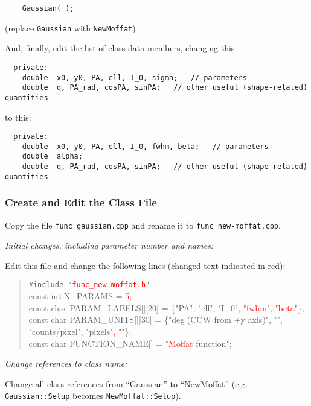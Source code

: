 \documentclass[10pt,a4paper,article]{memoir}
\newcommand{\red}{\textcolor{red}}
\begin{document}
\begin{verbatim}
    Gaussian( );
\end{verbatim}
(replace \texttt{Gaussian} with \texttt{NewMoffat})

And, finally, edit the list of class data members, changing this:
\begin{verbatim}
  private:
    double  x0, y0, PA, ell, I_0, sigma;   // parameters
    double  q, PA_rad, cosPA, sinPA;   // other useful (shape-related) quantities
\end{verbatim}
to this:
\begin{verbatim}
  private:
    double  x0, y0, PA, ell, I_0, fwhm, beta;   // parameters
    double  alpha;
    double  q, PA_rad, cosPA, sinPA;   // other useful (shape-related) quantities
\end{verbatim}


\subsubsection{Create and Edit the Class File}

Copy the file \texttt{func\_gaussian.cpp} and rename it to \texttt{func\_new-moffat.cpp}. 

\bigskip
\noindent \textit{Initial changes, including parameter number and names:}
\smallskip

Edit this file and change the following lines (changed text indicated in red):

\begin{quote}
\texttt{\#include "\red{func\_new-moffat.h}"} \\

const int  N\_PARAMS = \red{5}; \\

const char  PARAM\_LABELS[][20] = \{"PA", "ell", "I\_0", \red{"fwhm", "beta"}\}; \\

const char  PARAM\_UNITS[][30] = \{"deg (CCW from +y axis)", "", "counts/pixel",
				"pixels"\red{, ""}\}; \\

const char  FUNCTION\_NAME[] = "\red{Moffat} function";

\end{quote}

\bigskip
\noindent \textit{Change references to class name:}
\smallskip

Change all class references from ``Gaussian'' to ``NewMoffat'' (e.g.,
\texttt{Gaussian::Setup} becomes \texttt{NewMoffat::Setup}).
\end{document}
